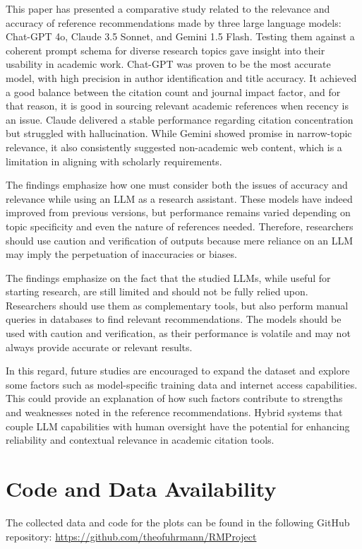 \documentclass[runningheads]{llncs}
\begin{document}
%

This paper has presented a comparative study related to the relevance and accuracy of reference recommendations made by three large language models: Chat-GPT 4o, Claude 3.5 Sonnet, and Gemini 1.5 Flash. Testing them against a coherent prompt schema for diverse research topics gave insight into their usability in academic work. Chat-GPT was proven to be the most accurate model, with high precision in author identification and title accuracy. It achieved a good balance between the citation count and journal impact factor, and for that reason, it is good in sourcing relevant academic references when recency is an issue. Claude delivered a stable performance regarding citation concentration but struggled with hallucination. While Gemini showed promise in narrow-topic relevance, it also consistently suggested non-academic web content, which is a limitation in aligning with scholarly requirements.

The findings emphasize how one must consider both the issues of accuracy and relevance while using an LLM as a research assistant. These models have indeed improved from previous versions, but performance remains varied depending on topic specificity and even the nature of references needed. Therefore, researchers should use caution and verification of outputs because mere reliance on an LLM may imply the perpetuation of inaccuracies or biases.

The findings emphasize on the fact that the studied LLMs, while useful for starting research, are still limited and should not be fully relied upon. Researchers should use them as complementary tools, but also perform manual queries in databases to find relevant recommendations. The models should be used with caution and verification, as their performance is volatile and may not always provide accurate or relevant results.

In this regard, future studies are encouraged to expand the dataset and explore some factors such as model-specific training data and internet access capabilities. This could provide an explanation of how such factors contribute to strengths and weaknesses noted in the reference recommendations. Hybrid systems that couple LLM capabilities with human oversight have the potential for enhancing reliability and contextual relevance in academic citation tools.

\section*{Code and Data Availability}
The collected data and code for the plots can be found in the following GitHub repository: \url{https://github.com/theofuhrmann/RMProject}

\end{document}
